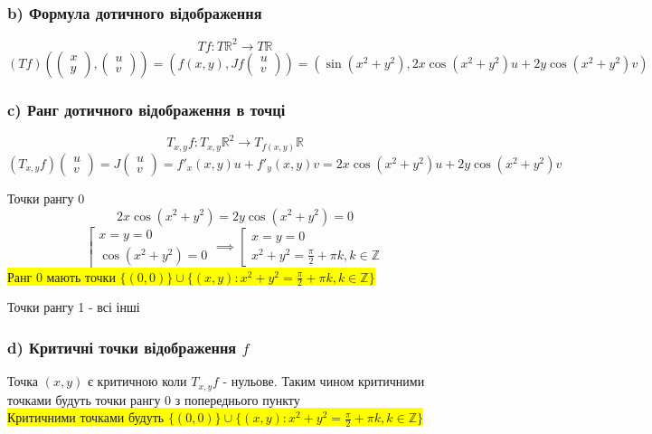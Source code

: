 \documentclass[10pt, a4paper]{article} %
\newcommand{\R}{\mathbb{R}}
\newcommand{\J}{J}
\begin{document}
\subsubsection*{b) Формула дотичного відображення}
\[Tf : T\R^2 \to T\R\]
\[(Tf)\left(\begin{pmatrix} x \\ y \end{pmatrix}, \begin{pmatrix} u \\ v \end{pmatrix}\right) 
= \left(f(x,y),\J f \begin{pmatrix} u \\ v \end{pmatrix}\right) 
= \left(\sin(x^2+y^2), 2x\cos(x^2+y^2)u + 2y\cos(x^2+y^2)v\right)\]

\subsubsection*{c) Ранг дотичного відображення в точці}
\[T_{x,y} f : T_{x,y}\R^2 \to T_{f(x,y)}\R\]
\[(T_{x,y} f) \begin{pmatrix} u \\ v \end{pmatrix}
= J\begin{pmatrix} u \\ v \end{pmatrix} = f'_x(x,y) u + f'_y(x,y) v = 2x\cos(x^2+y^2)u + 2y\cos(x^2+y^2)v\]

Точки рангу 0
\[2x\cos(x^2+y^2)=2y\cos(x^2+y^2)=0\]
\[\left[\begin{array}{l}
    x=y=0\\
    \cos(x^2+y^2) = 0
\end{array}\right. \implies \left[\begin{array}{l}
    x=y=0\\
    x^2+y^2 = \frac{\pi}{2}+\pi k, k \in \mathbb Z
\end{array}\right. \]
\colorbox{yellow}{Ранг 0 мають точки $\{(0,0)\} \cup \{(x,y) : x^2+y^2 = \frac{\pi}{2}+\pi k, k \in \mathbb Z\}$}

Точки рангу 1 - всі інші

\subsubsection*{d) Критичні точки відображення $f$}
Точка $(x,y)$ є критичною коли $T_{x,y}f$ - нульове.
Таким чином критичними точками будуть точки рангу 0 з попереднього пункту\\
\colorbox{yellow}{Критичними точками будуть $\{(0,0)\} \cup \{(x,y) : x^2+y^2 = \frac{\pi}{2}+\pi k, k \in \mathbb Z\}$}
\end{document}
